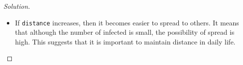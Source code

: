 \begin{enumerate} [a)]
\begin{proof} [Solution]
\begin{itemize}
				\item If \texttt{distance} increases, then it becomes easier to spread to others. It means that although the number of infected is small, the possibility of spread is high. This suggests that it is important to maintain distance in daily life.
			\end{itemize}
			\begin{figure}
				\hfill

\end{figure}
\end{proof}
\end{enumerate}

